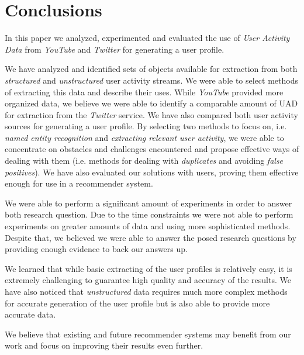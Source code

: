 \section{Conclusions}
\label{sec:conclusion}

In this paper we analyzed, experimented and evaluated the use of \textit{User Activity Data} from \textit{YouTube}
and \textit{Twitter} for generating a user profile.

We have analyzed and identified sets of objects available for extraction from both \textit{structured} and
\textit{unstructured} user activity streams. We were able to select methods of extracting this data and describe
their uses. While \textit{YouTube} provided more organized data, we believe we were able to identify a comparable
amount of UAD for extraction from the \textit{Twitter} service.
We have also compared both user activity sources for generating a user profile. By selecting two methods to focus
on, i.e. \textit{named entity recognition} and \textit{extracting relevant user activity}, we were able to concentrate
on obstacles and challenges encountered and propose effective ways of dealing with them (i.e. methods for dealing with
\textit{duplicates} and avoiding \textit{false positives}). We have also evaluated our solutions with users, proving
them effective enough for use in a recommender system.

We were able to perform a significant amount of experiments in order to answer both research question. Due to the time
constraints we were not able to perform experiments on greater amounts of data and using more sophisticated methods.
Despite that, we believed we were able to answer the posed research questions by providing enough evidence to back our
answers up.

We learned that while basic extracting of the user profiles is relatively easy, it is extremely challenging to
guarantee high quality and accuracy of the results. We have also noticed that \textit{unstructured} data requires
much more complex methods for accurate generation of the user profile but is also able to provide more
accurate data.

We believe that existing and future recommender systems may benefit from our work and focus on improving their results
even further.